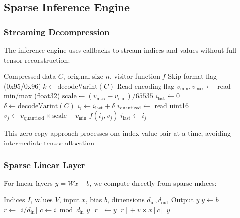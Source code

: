 \documentclass[11pt]{article}
\begin{document}
\subsection{Sparse Inference Engine}

\subsubsection{Streaming Decompression}

The inference engine uses callbacks to stream indices and values without full tensor reconstruction:

\begin{algorithm}[h]
\caption{Streaming Index-Value Decompression}
\begin{algorithmic}[1]
\REQUIRE Compressed data $C$, original size $n$, visitor function $f$
\STATE Skip format flag (0x95/0x96)
\STATE $k \leftarrow \text{decodeVarint}(C)$
\STATE Read encoding flag
\STATE $v_{\min}, v_{\max} \leftarrow$ read min/max (float32)
\STATE $\text{scale} \leftarrow (v_{\max} - v_{\min}) / 65535$
\STATE $i_{\text{last}} \leftarrow 0$
    \STATE $\delta \leftarrow \text{decodeVarint}(C)$
    \STATE $i_j \leftarrow i_{\text{last}} + \delta$
    \STATE $v_{\text{quantized}} \leftarrow$ read uint16
    \STATE $v_j \leftarrow v_{\text{quantized}} \times \text{scale} + v_{\min}$
    \STATE $f(i_j, v_j)$ 
    \STATE $i_{\text{last}} \leftarrow i_j$
\ENDFOR
\end{algorithmic}
\end{algorithm}

This zero-copy approach processes one index-value pair at a time, avoiding intermediate tensor allocation.

\subsubsection{Sparse Linear Layer}

For linear layers $y = Wx + b$, we compute directly from sparse indices:

\begin{algorithm}[h]
\caption{Sparse Linear Forward}
\begin{algorithmic}[1]
\REQUIRE Indices $I$, values $V$, input $x$, bias $b$, dimensions $d_{\text{in}}, d_{\text{out}}$
\ENSURE Output $y$
\STATE $y \leftarrow b$ 
    \STATE $r \leftarrow \lfloor i / d_{\text{in}} \rfloor$ 
    \STATE $c \leftarrow i \bmod d_{\text{in}}$ 
        \STATE $y[r] \leftarrow y[r] + v \times x[c]$
    \ENDIF
\ENDFOR
\RETURN $y$
\end{algorithmic}
\end{algorithm}
\end{document}
